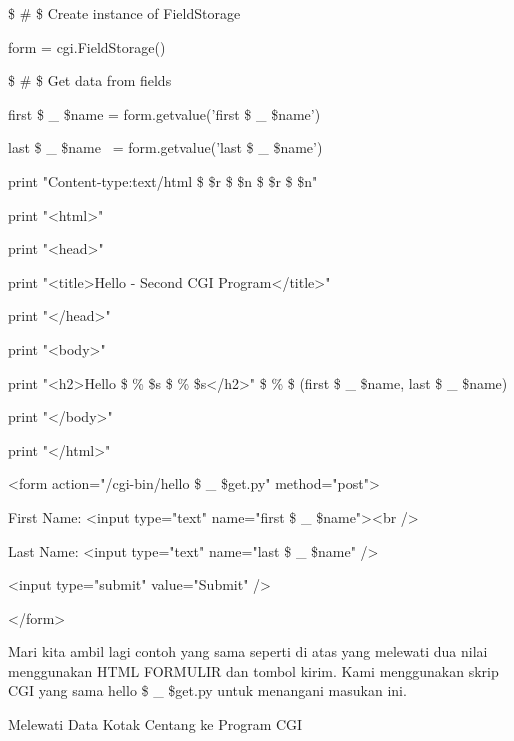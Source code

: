 \begin{12pt}
\begin{12pt}
\vspace{12pt}
\noindent 
 \$  \#  \$ Create instance of FieldStorage  \par
\noindent 
form = cgi.FieldStorage()  \par
\vspace{12pt}
\noindent 
 \$  \#  \$ Get data from fields \par
\noindent 
first \$  \_  \$name = form.getvalue('first \$  \_  \$name') \par
\noindent 
last \$  \_  \$name~ = form.getvalue('last \$  \_  \$name') \par
\vspace{12pt}
\noindent 
print "Content-type:text/html \$  \setminus  \$r \$  \setminus  \$n \$  \setminus  \$r \$  \setminus  \$n" \par
\noindent 
print "<html>" \par
\noindent 
print "<head>" \par
\noindent 
print "<title>Hello - Second CGI Program</title>" \par
\noindent 
print "</head>" \par
\noindent 
print "<body>" \par
\noindent 
print "<h2>Hello  \$  \%  \$s  \$  \%  \$s</h2>" \$  \%  \$ (first \$  \_  \$name, last \$  \_  \$name) \par
\noindent 
print "</body>" \par
\noindent 
print "</html>" \par
\vspace{12pt}
\noindent 
<form action="/cgi-bin/hello \$  \_  \$get.py" method="post"> \par
\noindent 
First Name: <input type="text" name="first \$  \_  \$name"><br /> \par
\noindent 
Last Name: <input type="text" name="last \$  \_  \$name" /> \par
\vspace{12pt}
\noindent 
<input type="submit" value="Submit" /> \par
\noindent 
</form> \par
\vspace{12pt}
Mari kita ambil lagi contoh yang sama seperti di atas yang melewati dua nilai menggunakan HTML FORMULIR dan tombol kirim. Kami menggunakan skrip CGI yang sama hello \$  \_  \$get.py untuk menangani masukan ini. \par
\noindent 
Melewati Data Kotak Centang ke Program CGI \par
\vspace{12pt}

\end{12pt}
\end{12pt}
